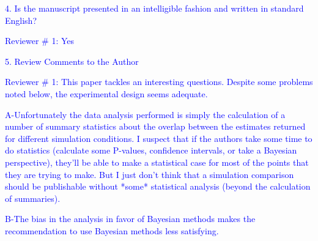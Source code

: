\documentclass[11pt]{letter}
\begin{document}
\begin{letter}{}
\textcolor{blue}{4. Is the manuscript presented in an intelligible fashion and written in standard English?}

\textcolor{blue}{Reviewer $\#$ 1: Yes}

\textcolor{blue}{5. Review Comments to the Author}

\textcolor{blue}{Reviewer $\#$ 1: This paper tackles an interesting questions. Despite some problems noted below, the experimental design seems adequate.}


\textcolor{blue}{A-Unfortunately the data analysis performed is simply the calculation of a number of summary statistics about the overlap between the estimates returned for different simulation conditions. I suspect that if the authors take some time to do statistics (calculate some P-values, confidence intervals, or take a Bayesian perspective), they'll be able to make a statistical case for most of the points that they are trying to make. But I just don't think that a simulation comparison should be publishable without *some* statistical analysis (beyond the calculation of summaries).}




\textcolor{blue}{B-The bias in the analysis in favor of Bayesian methods makes the recommendation to use Bayesian methods less satisfying.}


\end{letter}
\end{document}

